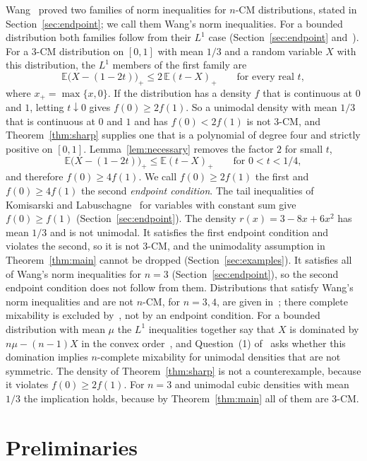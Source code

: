 \documentclass[11pt]{amsart}
\theoremstyle{remark}
\numberwithin{equation}{section}
\newcommand{\E}{\mathbb{E}}
\begin{document}
Wang~\cite[Theorem~5]{Wan15} proved two families of norm inequalities for
$n$-CM distributions, stated in Section~\ref{sec:endpoint}; we call them
Wang's norm inequalities. For a bounded distribution both families follow
from their $L^1$ case (Section~\ref{sec:endpoint}
and~\cite[Proposition~3.1]{Shm26}). For a $3$-CM
distribution on $[0,1]$ with mean $1/3$ and a random variable $X$ with this
distribution, the $L^1$ members of the first family are
\[
\E\bigl(X-(1-2t)\bigr)_+\le2\,\E(t-X)_+\qquad\text{for every real }t,
\]
where $x_+=\max\{x,0\}$. If the distribution has a density $f$ that is
continuous at $0$ and $1$, letting $t\downarrow0$ gives $f(0)\ge2f(1)$. So a
unimodal density with mean $1/3$ that is continuous at $0$ and $1$ and has
$f(0)<2f(1)$ is not $3$-CM, and Theorem~\ref{thm:sharp} supplies one that is
a polynomial of degree four and strictly positive on $[0,1]$.
Lemma~\ref{lem:necessary} removes the factor $2$ for small $t$,
\[
\E\bigl(X-(1-2t)\bigr)_+\le\E(t-X)_+\qquad\text{for }0<t<1/4,
\]
and therefore $f(0)\ge4f(1)$. We call $f(0)\ge2f(1)$ the first and
$f(0)\ge4f(1)$ the second \emph{endpoint condition}. The tail inequalities
of Komisarski and Labuschagne~\cite[Corollary~2]{KL24} for variables with
constant sum give $f(0)\ge f(1)$ (Section~\ref{sec:endpoint}). The density
$r(x)=3-8x+6x^2$ has mean $1/3$ and is not unimodal. It satisfies the first
endpoint condition and violates the second, so it is not $3$-CM, and the
unimodality assumption in Theorem~\ref{thm:main} cannot be dropped
(Section~\ref{sec:examples}). It satisfies all of Wang's norm inequalities
for $n=3$ (Section~\ref{sec:endpoint}), so the second endpoint condition
does not follow from them. Distributions that satisfy Wang's norm
inequalities and are not $n$-CM, for $n=3,4$, are given
in~\cite[Theorem~1.4]{Shm26}; there complete mixability is excluded
by~\cite[Lemma~5.1 and Proposition~5.4]{Shm26}, not by an
endpoint condition. For a bounded distribution with mean $\mu$ the $L^1$
inequalities together say that $X$ is dominated by $n\mu-(n-1)X$ in the
convex order~\cite[Theorem~1.3]{Shm26}, and Question~(1)
of~\cite[Section~6]{Shm26} asks whether this domination implies
$n$-complete mixability for unimodal densities that are not symmetric. The
density of Theorem~\ref{thm:sharp} is not a counterexample, because it
violates $f(0)\ge2f(1)$. For $n=3$ and unimodal cubic densities with mean
$1/3$ the implication holds, because by Theorem~\ref{thm:main} all of them
are $3$-CM.

\section{Preliminaries}
\end{document}
